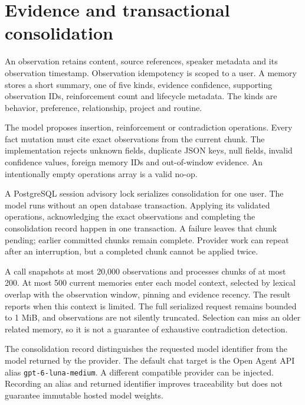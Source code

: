 \documentclass[11pt]{article}
\begin{document}
\section{Evidence and transactional consolidation}
An observation retains content, source references, speaker metadata and its observation timestamp. Observation idempotency is scoped to a user. A memory stores a short summary, one of five kinds, evidence confidence, supporting observation IDs, reinforcement count and lifecycle metadata. The kinds are behavior, preference, relationship, project and routine.

The model proposes insertion, reinforcement or contradiction operations. Every fact mutation must cite exact observations from the current chunk. The implementation rejects unknown fields, duplicate JSON keys, null fields, invalid confidence values, foreign memory IDs and out-of-window evidence. An intentionally empty operations array is a valid no-op.

A PostgreSQL session advisory lock serializes consolidation for one user. The model runs without an open database transaction. Applying its validated operations, acknowledging the exact observations and completing the consolidation record happen in one transaction. A failure leaves that chunk pending; earlier committed chunks remain complete. Provider work can repeat after an interruption, but a completed chunk cannot be applied twice.

A call snapshots at most 20,000 observations and processes chunks of at most 200. At most 500 current memories enter each model context, selected by lexical overlap with the observation window, pinning and evidence recency. The result reports when this context is limited. The full serialized request remains bounded to 1 MiB, and observations are not silently truncated. Selection can miss an older related memory, so it is not a guarantee of exhaustive contradiction detection.

The consolidation record distinguishes the requested model identifier from the model returned by the provider. The default chat target is the Open Agent API alias \texttt{gpt-6-luna-medium}. A different compatible provider can be injected. Recording an alias and returned identifier improves traceability but does not guarantee immutable hosted model weights.
\end{document}
